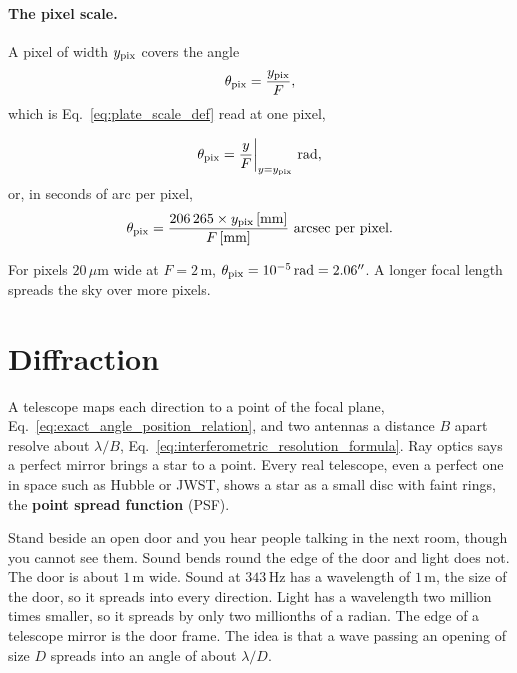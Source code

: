 \paragraph{The pixel scale.} A pixel of width $y_{\rm pix}$ covers the angle
\begin{equation}
	\theta_{\rm pix} = \frac{y_{\rm pix}}{F},
	\label{eq:pixel_scale_def}
\end{equation}
which is Eq.~\eqref{eq:plate_scale_def} read at one pixel,
\begin{keyresult}
	\begin{equation}
		\theta_{\rm pix} = \frac{y}{F}\bigg\lvert_{y=y_{\rm pix}}\ \text{rad},
		\label{eq:pixel_scale_lvert}
	\end{equation}
	or, in seconds of arc per pixel,
	\begin{equation}
		\theta_{\rm pix} = \frac{206\,265\times y_{\rm pix}\,[\mathrm{mm}]}{F\,[\mathrm{mm}]}\ \text{arcsec per pixel}.
		\label{eq:pixel_scale_boxed_result}
	\end{equation}
\end{keyresult}
For pixels $20\,\mu\mathrm m$ wide at $F=2\,\mathrm m$, $\theta_{\rm pix}=10^{-5}\,\mathrm{rad}=2.06''$. A longer focal length spreads the sky over more pixels.

\section{Diffraction}
\label{sec:diffraction}

A telescope maps each direction to a point of the focal plane, Eq.~\eqref{eq:exact_angle_position_relation}, and two antennas a distance $B$ apart resolve about $\lambda/B$, Eq.~\eqref{eq:interferometric_resolution_formula}. Ray optics says a perfect mirror brings a star to a point. Every real telescope, even a perfect one in space such as Hubble or JWST, shows a star as a small disc with faint rings, the \textbf{point spread function} (PSF).

Stand beside an open door and you hear people talking in the next room, though you cannot see them. Sound bends round the edge of the door and light does not. The door is about $1\,\mathrm m$ wide. Sound at $343\,\mathrm{Hz}$ has a wavelength of $1\,\mathrm m$, the size of the door, so it spreads into every direction. Light has a wavelength two million times smaller, so it spreads by only two millionths of a radian. The edge of a telescope mirror is the door frame. The idea is that a wave passing an opening of size $D$ spreads into an angle of about $\lambda/D$.

